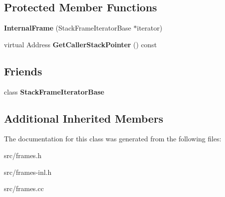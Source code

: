 \subsection*{Protected Member Functions}
\begin{DoxyCompactItemize}
\item 
\hypertarget{classv8_1_1internal_1_1_internal_frame_a9bdd4bb2a9b9f4806cd69cd78b11b438}{}{\bfseries Internal\+Frame} (Stack\+Frame\+Iterator\+Base $\ast$iterator)\label{classv8_1_1internal_1_1_internal_frame_a9bdd4bb2a9b9f4806cd69cd78b11b438}

\item 
\hypertarget{classv8_1_1internal_1_1_internal_frame_a941a7be4a6f2fe1142207417795a99a4}{}virtual Address {\bfseries Get\+Caller\+Stack\+Pointer} () const \label{classv8_1_1internal_1_1_internal_frame_a941a7be4a6f2fe1142207417795a99a4}

\end{DoxyCompactItemize}
\subsection*{Friends}
\begin{DoxyCompactItemize}
\item 
\hypertarget{classv8_1_1internal_1_1_internal_frame_ac7310421866976ca454bbe11c5f926c3}{}class {\bfseries Stack\+Frame\+Iterator\+Base}\label{classv8_1_1internal_1_1_internal_frame_ac7310421866976ca454bbe11c5f926c3}

\end{DoxyCompactItemize}
\subsection*{Additional Inherited Members}


The documentation for this class was generated from the following files\+:\begin{DoxyCompactItemize}
\item 
src/frames.\+h\item 
src/frames-\/inl.\+h\item 
src/frames.\+cc\end{DoxyCompactItemize}
